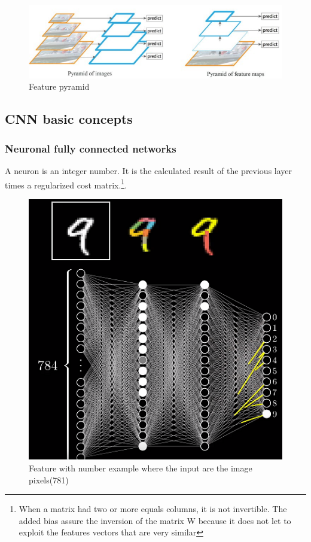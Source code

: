 \documentclass[10pt]{article}
\begin{document}
\begin{figure}[H]
  \begin{center}
    \includegraphics[scale=0.6]{FPN.PNG}
  \end{center}
  \caption{Feature pyramid  \cite{lin2017feature}}
\end{figure}


\subsection{CNN basic concepts}
\subsubsection{Neuronal fully connected networks}
A neuron is an integer number. It is the calculated result of the previous layer times a regularized cost matrix.\footnote{When a  matrix had two or more equals columns, it is not invertible. The added bias assure the inversion of the matrix W because it does not let to exploit the features vectors that are very similar}.\\

\begin{figure}[H]
  \begin{center}
    \includegraphics[scale=0.6]{features.PNG}
  \end{center}
  \caption{Feature with number example where the input are the image pixels(781) \cite{NeuronalNetwork}}
\end{figure}
\end{document}
